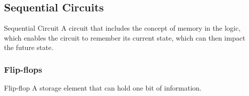 \documentclass[../notes.tex]{subfiles}
\begin{document}
			\subsection{Sequential Circuits}
				\begin{definition}{Sequential Circuit}
					A circuit that includes the concept of memory in the logic, which enables the circuit to remember its current state, which can then impact the future state.
				\end{definition}
				\subsubsection{Flip-flops}
					\begin{definition}{Flip-flop}
						A storage element that can hold one bit of information.
					\end{definition}
			\pagebreak
\end{document}
